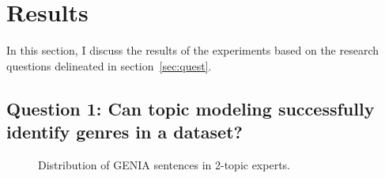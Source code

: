 


\section{Results}\label{sec:results}


In this section, I discuss the results of the experiments based on the research questions delineated in section~\ref{sec:quest}.

\subsection{Question 1: Can topic modeling successfully identify genres in a dataset?}

\begin{figure}[!t]
    \centering
 \caption{Distribution of GENIA sentences in 2-topic experts.}\label{fig:distsent2}
 \end{figure}
 

